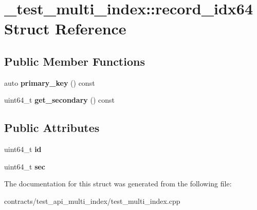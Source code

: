 \hypertarget{struct__test__multi__index_1_1record__idx64}{}\section{\+\_\+test\+\_\+multi\+\_\+index\+:\+:record\+\_\+idx64 Struct Reference}
\label{struct__test__multi__index_1_1record__idx64}
\subsection*{Public Member Functions}
\begin{DoxyCompactItemize}
\item 
\mbox{\label{struct__test__multi__index_1_1record__idx64_a8153c5523206271caf52d57d3a51c8a3}} 
auto {\bfseries primary\+\_\+key} () const
\item 
\mbox{\label{struct__test__multi__index_1_1record__idx64_a5bb65269c99f40e7aa7e7e41ea236c38}} 
uint64\+\_\+t {\bfseries get\+\_\+secondary} () const
\end{DoxyCompactItemize}
\subsection*{Public Attributes}
\begin{DoxyCompactItemize}
\item 
\mbox{\label{struct__test__multi__index_1_1record__idx64_aefe1df9a83f5aa47228e1f2c661c83cb}} 
uint64\+\_\+t {\bfseries id}
\item 
\mbox{\label{struct__test__multi__index_1_1record__idx64_ac73b74aa672a2a4b9794e9cc4dd6ab70}} 
uint64\+\_\+t {\bfseries sec}
\end{DoxyCompactItemize}


The documentation for this struct was generated from the following file\+:\begin{DoxyCompactItemize}
\item 
contracts/test\+\_\+api\+\_\+multi\+\_\+index/test\+\_\+multi\+\_\+index.\+cpp\end{DoxyCompactItemize}
